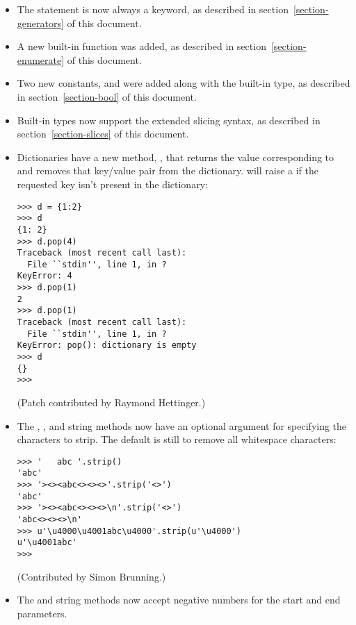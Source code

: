 \documentclass{howto}
\begin{document}
\begin{itemize}
\item The  statement is now always a keyword, as
described in section~\ref{section-generators} of this document.

\item A new built-in function  
was added, as described in section~\ref{section-enumerate} of this
document.

\item Two new constants,  and  were
added along with the built-in  type, as described in
section~\ref{section-bool} of this document.

\item Built-in types now support the extended slicing syntax, 
as described in section~\ref{section-slices} of this document.

\item Dictionaries have a new method, , that
returns the value corresponding to  and removes that
key/value pair from the dictionary.   will raise a
 if the requested key isn't present in the
dictionary:

\begin{verbatim}
>>> d = {1:2}
>>> d
{1: 2}
>>> d.pop(4)
Traceback (most recent call last):
  File ``stdin'', line 1, in ?
KeyError: 4
>>> d.pop(1)
2
>>> d.pop(1)
Traceback (most recent call last):
  File ``stdin'', line 1, in ?
KeyError: pop(): dictionary is empty
>>> d
{}
>>>
\end{verbatim}

(Patch contributed by Raymond Hettinger.)

\item The , , and 
string methods now have an optional argument for specifying the
characters to strip.  The default is still to remove all whitespace
characters:

\begin{verbatim}
>>> '   abc '.strip()
'abc'
>>> '><><abc<><><>'.strip('<>')
'abc'
>>> '><><abc<><><>\n'.strip('<>')
'abc<><><>\n'
>>> u'\u4000\u4001abc\u4000'.strip(u'\u4000')
u'\u4001abc'
>>>
\end{verbatim}

(Contributed by Simon Brunning.)

\item The  and 
string methods now accept negative numbers for the start and end
parameters.


\end{itemize}
\end{document}
